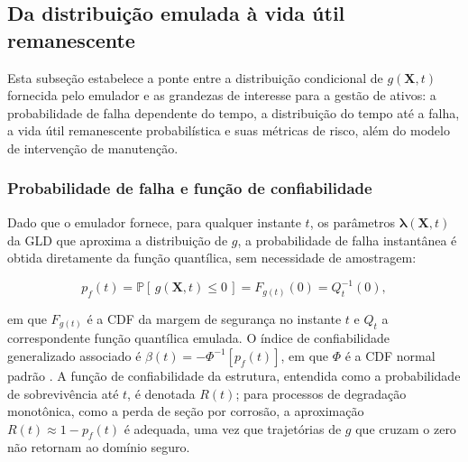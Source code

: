 \subsection{Da distribui\c{c}\~ao emulada \`a vida \'util remanescente}
\label{subsec:rul}

Esta subseção estabelece a ponte entre a distribuição condicional de $g(\mathbf{X},t)$ fornecida pelo emulador e as grandezas de interesse para a gestão de ativos: a probabilidade de falha dependente do tempo, a distribuição do tempo até a falha, a vida útil remanescente probabilística e suas métricas de risco, além do modelo de intervenção de manutenção.

\subsubsection{Probabilidade de falha e fun\c{c}\~ao de confiabilidade}
\label{subsec:pf}

Dado que o emulador fornece, para qualquer instante $t$, os parâmetros $\hat{\boldsymbol{\lambda}}(\mathbf{X},t)$ da GLD que aproxima a distribuição de $g$, a probabilidade de falha instantânea é obtida diretamente da função quantílica, sem necessidade de amostragem:

\begin{equation}
p_f(t) = \mathbb{P}\left[\, g(\mathbf{X}, t) \leq 0 \,\right] = F_{g(t)}(0) = Q^{-1}_{t}(0),
\label{eq:pf_t}
\end{equation}

\noindent em que $F_{g(t)}$ é a CDF da margem de segurança no instante $t$ e $Q_t$ a correspondente função quantílica emulada. O índice de confiabilidade generalizado associado é $\beta(t) = -\Phi^{-1}\!\left[p_f(t)\right]$, em que $\Phi$ é a CDF normal padrão \parencite{melchers2018}. A função de confiabilidade da estrutura, entendida como a probabilidade de sobrevivência até $t$, é denotada $R(t)$; para processos de degradação monotônica, como a perda de seção por corrosão, a aproximação $R(t) \approx 1 - p_f(t)$ é adequada, uma vez que trajetórias de $g$ que cruzam o zero não retornam ao domínio seguro. 

